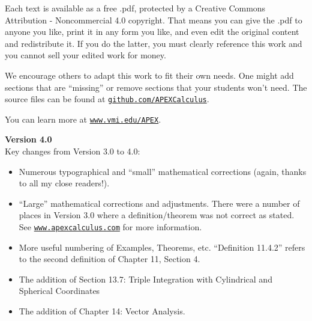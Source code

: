 Each text is available as a free .pdf, protected by a Creative Commons Attribution - Noncommercial 4.0 copyright. That  means you can give the .pdf to anyone you like, print it in any form you like, and even edit the original content and redistribute it. If you do the latter, you must  clearly reference this work and you cannot sell your edited work for money.

We encourage others to adapt this work to fit their own needs. One might add sections that are ``missing'' or remove sections that your students won't need. The source files can be found at \texttt{\href{https://github.com/APEXCalculus}{github.com/APEXCalculus}}.

You can learn more at \texttt{\href{http://www.vmi.edu/APEX}{www.vmi.edu/APEX}}.\\
\thispagestyle{empty}

\noindent\textbf{\large Version 4.0}\\

Key changes from Version 3.0 to 4.0:
\begin{itemize}
	\item Numerous typographical and ``small'' mathematical corrections (again, thanks to all my close readers!).
	\item	``Large'' mathematical corrections and adjustments. There were a number of places in Version 3.0 where a definition/theorem was not correct as stated. See \texttt{\href{http://apexcalculus.com}{www.apexcalculus.com}} for more information.
	\item More useful numbering of Examples, Theorems, etc. ``Definition 11.4.2'' refers to the second definition of Chapter 11, Section 4. 
	\item	The addition of Section 13.7: Triple Integration with Cylindrical and Spherical Coordinates
	\item	The addition of Chapter 14: Vector Analysis.
\end{itemize}
\thispagestyle{empty}

